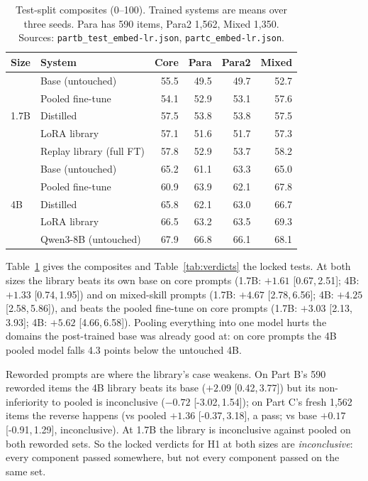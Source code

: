 \documentclass[11pt]{article}
\newcommand{\ci}[2]{[#1,\allowbreak\,#2]}
\begin{document}
\begin{table}[t]
\centering
\small
\begin{tabular}{llrrrr}
\toprule
Size & System & Core & Para & Para2 & Mixed \\
\midrule
\multirow{5}{*}{1.7B} & Base (untouched) & 55.5 & 49.5 & 49.7 & 52.7 \\
 & Pooled fine-tune & 54.1 & 52.9 & 53.1 & 57.6 \\
 & Distilled & 57.5 & 53.8 & 53.8 & 57.5 \\
 & LoRA library & 57.1 & 51.6 & 51.7 & 57.3 \\
 & Replay library (full FT) & 57.8 & 52.9 & 53.7 & 58.2 \\
\midrule
\multirow{5}{*}{4B} & Base (untouched) & 65.2 & 61.1 & 63.3 & 65.0 \\
 & Pooled fine-tune & 60.9 & 63.9 & 62.1 & 67.8 \\
 & Distilled & 65.8 & 62.1 & 63.0 & 66.7 \\
 & LoRA library & 66.5 & 63.2 & 63.5 & 69.3 \\
 & Qwen3-8B (untouched) & 67.9 & 66.8 & 66.1 & 68.1 \\
\bottomrule
\end{tabular}
\caption{Test-split composites (0--100). Trained systems are means over three seeds. Para has 590 items, Para2 1,562,
Mixed 1,350. Sources: \texttt{partb\_test\_embed-lr.json}, \texttt{partc\_embed-lr.json}.}
\label{tab:main}
\end{table}

Table~\ref{tab:main} gives the composites and Table~\ref{tab:verdicts} the locked tests. At both sizes the library
beats its own base on core prompts (1.7B: $+1.61$ \ci{0.67}{2.51}; 4B: $+1.33$ \ci{0.74}{1.95}) and on mixed-skill
prompts (1.7B: $+4.67$ \ci{2.78}{6.56}; 4B: $+4.25$ \ci{2.58}{5.86}), and beats the pooled fine-tune on core prompts
(1.7B: $+3.03$ \ci{2.13}{3.93}; 4B: $+5.62$ \ci{4.66}{6.58}). Pooling everything into one model hurts the domains the
post-trained base was already good at: on core prompts the 4B pooled model falls 4.3 points below the untouched 4B.

Reworded prompts are where the library's case weakens. On Part B's 590 reworded items the 4B library beats its base
($+2.09$ \ci{0.42}{3.77}) but its non-inferiority to pooled is inconclusive ($-0.72$ \ci{-3.02}{1.54}); on Part C's
fresh 1,562 items the reverse happens (vs pooled $+1.36$ \ci{-0.37}{3.18}, a pass; vs base $+0.17$
\ci{-0.91}{1.29}, inconclusive). At 1.7B the library is inconclusive against pooled on both reworded sets. So the
locked verdicts for H1 at both sizes are \emph{inconclusive}: every component passed somewhere, but not every
component passed on the same set.
\end{document}
